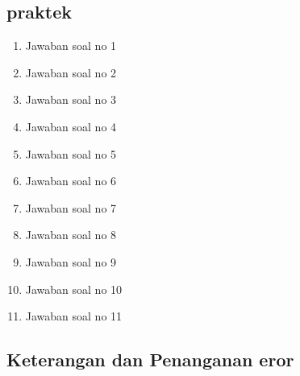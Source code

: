 \subsection{praktek}
\begin{enumerate}
	\item Jawaban soal no 1
	
	\item Jawaban soal no 2
	
	\item Jawaban soal no 3
	
	\item Jawaban soal no 4
	
	\item Jawaban soal no 5
	
	\item Jawaban soal no 6
	
	\item Jawaban soal no 7
	
	\item Jawaban soal no 8
	
	\item Jawaban soal no 9
	
	\item Jawaban soal no 10
	
	\item Jawaban soal no 11
	
\end{enumerate}

\subsection{Keterangan dan Penanganan eror}

